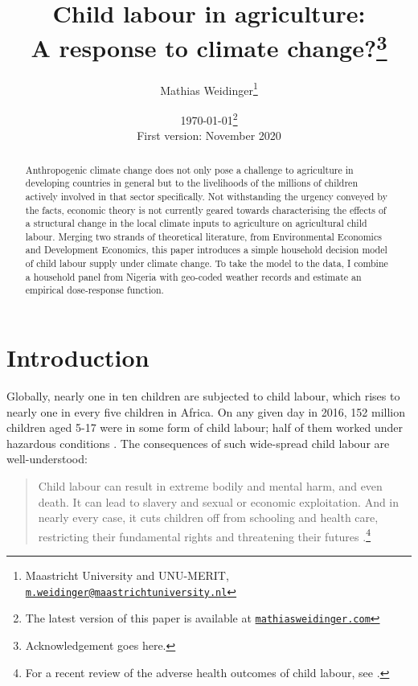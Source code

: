 \documentclass[a4paper,12pt]{article}
\title{Child labour in agriculture: \\ A response to climate change?\footnote{Acknowledgement goes here.}}
\author{Mathias Weidinger\footnote{Maastricht University and UNU-MERIT, \href{mailto:m.weidinger@maastrichtuniversit.nl}{\texttt{m.weidinger@maastrichtuniversity.nl}}}}
\date{\today \footnote{The latest version of this paper is available at \href{https://www.mathiasweidinger.com}{\texttt{mathiasweidinger.com}}} \\ First version: November 2020}
\theoremstyle{plain}
\theoremstyle{definition}
\theoremstyle{definition}
\theoremstyle{definition}
\theoremstyle{definition}
\begin{document}
\maketitle

\begin{abstract}
Anthropogenic climate change does not only pose a challenge to agriculture in developing countries in general but to the livelihoods of the millions of children actively involved in that sector specifically. Not withstanding the urgency conveyed by the facts, economic theory is not currently geared towards characterising the effects of a structural change in the local climate inputs to agriculture on agricultural child labour. Merging two strands of theoretical literature, from Environmental Economics and Development Economics, this paper introduces a simple household decision model of child labour supply under climate change. To take the model to the data, I combine a household panel from Nigeria with geo-coded weather records and estimate an empirical dose-response function.

\end{abstract}
\clearpage




\section{Introduction}
\label{intro}

Globally, nearly one in ten children are subjected to child labour, which rises to nearly one in every five children in Africa. On any given day in 2016, 152 million children aged 5-17 were in some form of child labour; half of them worked under hazardous conditions \citep{ILO2017}. The consequences of such wide-spread child labour are well-understood:

\begin{quote}
    Child labour can result in extreme bodily and mental harm, and even death. It can lead to slavery and sexual or economic exploitation. And in nearly every case, it cuts children off from schooling and health care, restricting their fundamental rights and threatening their futures \citep{UNICEF2020}.\footnote{For a recent review of the adverse health outcomes of child labour, see \citet{Ibrahim2018}.}
\end{quote}
\end{document}
